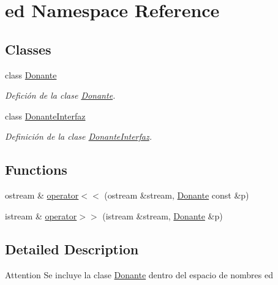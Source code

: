\hypertarget{namespaceed}{\section{ed Namespace Reference}
\label{namespaceed}
}
\subsection*{Classes}
\begin{DoxyCompactItemize}
\item 
class \hyperlink{classed_1_1Donante}{Donante}
\begin{DoxyCompactList}\small\item\em Defición de la clase \hyperlink{classed_1_1Donante}{Donante}. \end{DoxyCompactList}\item 
class \hyperlink{classed_1_1DonanteInterfaz}{Donante\-Interfaz}
\begin{DoxyCompactList}\small\item\em Definición de la clase \hyperlink{classed_1_1DonanteInterfaz}{Donante\-Interfaz}. \end{DoxyCompactList}\end{DoxyCompactItemize}
\subsection*{Functions}
\begin{DoxyCompactItemize}
\item 
ostream \& \hyperlink{namespaceed_a2f863e2611a159ce8c43a30836febb8c}{operator$<$$<$} (ostream \&stream, \hyperlink{classed_1_1Donante}{Donante} const \&p)
\item 
istream \& \hyperlink{namespaceed_aded1507a91c2b68863018cdc56aec49e}{operator$>$$>$} (istream \&stream, \hyperlink{classed_1_1Donante}{Donante} \&p)
\end{DoxyCompactItemize}


\subsection{Detailed Description}
\begin{DoxyAttention}{Attention}
Se incluye la clase \hyperlink{classed_1_1Donante}{Donante} dentro del espacio de nombres ed 
\end{DoxyAttention}


